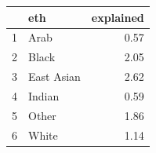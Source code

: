 \documentclass{amsart}
\begin{document}
\begin{table}[ht]
\centering
\begin{tabular}{rlr}
  \hline
 & eth & explained \\ 
  \hline
1 & Arab & 0.57 \\ 
  2 & Black & 2.05 \\ 
  3 & East Asian & 2.62 \\ 
  4 & Indian & 0.59 \\ 
  5 & Other & 1.86 \\ 
  6 & White & 1.14 \\ 
   \hline
\end{tabular}
\end{table}
\end{document}
